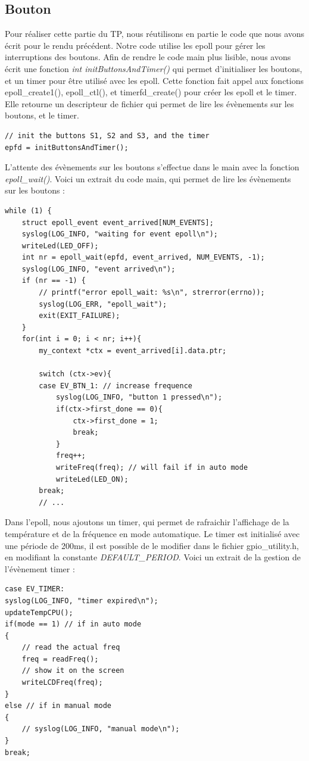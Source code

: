 \documentclass[
	a4paper, %
	10pt, %
]{CSUniSchoolLabReport}
\begin{document}
\subsection{Bouton}\label{Bouton}
Pour réaliser cette partie du TP, nous réutilisons en partie le code que nous avons écrit pour le rendu précédent.
Notre code utilise les epoll pour gérer les interruptions des boutons.
Afin de rendre le code main plus lisible, nous avons écrit une fonction \textit{int initButtonsAndTimer()} qui permet d'initialiser les boutons, et un timer pour être utilisé avec les epoll.
Cette fonction fait appel aux fonctions epoll\_create1(), epoll\_ctl(), et timerfd\_create() pour créer les epoll et le timer.
Elle retourne un descripteur de fichier qui permet de lire les évènements sur les boutons, et le timer.
\begin{lstlisting}[style=CStyle]
// init the buttons S1, S2 and S3, and the timer
epfd = initButtonsAndTimer();
\end{lstlisting}
L'attente des évènements sur les boutons s'effectue dans le main avec la fonction \textit{epoll\_wait()}.
Voici un extrait du code main, qui permet de lire les évènements sur les boutons : \\
\begin{lstlisting}[style=CStyle]
while (1) {
	struct epoll_event event_arrived[NUM_EVENTS];
	syslog(LOG_INFO, "waiting for event epoll\n");
	writeLed(LED_OFF);
	int nr = epoll_wait(epfd, event_arrived, NUM_EVENTS, -1);
	syslog(LOG_INFO, "event arrived\n");
	if (nr == -1) {
		// printf("error epoll_wait: %s\n", strerror(errno));
		syslog(LOG_ERR, "epoll_wait");
		exit(EXIT_FAILURE);
	}
	for(int i = 0; i < nr; i++){
		my_context *ctx = event_arrived[i].data.ptr;

		switch (ctx->ev){
		case EV_BTN_1: // increase frequence
			syslog(LOG_INFO, "button 1 pressed\n");
			if(ctx->first_done == 0){
				ctx->first_done = 1;
				break;
			}
			freq++;
			writeFreq(freq); // will fail if in auto mode
			writeLed(LED_ON);
		break;
		// ...
\end{lstlisting}

Dans l'epoll, nous ajoutons un timer, qui permet de rafraichir l'affichage de la température et de la fréquence en mode automatique.
Le timer est initialisé avec une période de 200ms, il est possible de le modifier dans le fichier gpio\_utility.h, en modifiant la constante \textit{DEFAULT\_PERIOD}.
Voici un extrait de la gestion de l'évènement timer : \\
\begin{lstlisting}[style=CStyle]
case EV_TIMER:
syslog(LOG_INFO, "timer expired\n");
updateTempCPU();
if(mode == 1) // if in auto mode
{
	// read the actual freq
	freq = readFreq();
	// show it on the screen
	writeLCDFreq(freq); 
}
else // if in manual mode
{
	// syslog(LOG_INFO, "manual mode\n");
}
break;
\end{lstlisting}
\end{document}
